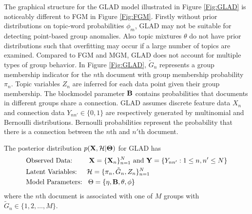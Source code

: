 The  graphical structure for the GLAD model illustrated in Figure \ref{Fig:GLAD} is noticeably different to FGM in Figure \ref{Fig:FGM}. Firstly without  prior distributions on topic-word probabilities $\phi_m$, GLAD may not be suitable for detecting point-based group anomalies. Also topic mixtures $\theta$ do not have prior distributions such that overfitting may occur if a large number of topics are examined. Compared to FGM and MGM, GLAD   does not account for multiple types of group behavior. %
In Figure \ref{Fig:GLAD}, 
  ${\tilde G}_{n}$ represents a group membership indicator for the $n$th document with group membership  probability $\pi_n$. Topic variables $Z_n$ are inferred for each data point given their group membership.    The blockmodel parameter $\bf B$ contains  probabilities that documents in different groups share a connection. %
GLAD assumes discrete feature data  $ X_{n}$ and connection data $Y_{n n'} \in \{0,1\}$  are respectively generated by  multinomial and Bernoulli distributions. Bernoulli probabilities represent the probability that there is a connection between the $n$th and $n'$th document.%

 The  posterior distribution %
$p({\bf X},\mathcal{H}| \boldsymbol\Theta) $ 
 for GLAD has %
 \begin{align*}
& \mbox{Observed Data:  \;\; \quad}  {\bf X}= \{{\bf X}_{n} \}_{n=1}^N \mbox{ and } {\bf Y} =\{Y_{nn'}: 1 \le n,n' \le N \} \\
 & \mbox{Latent Variables: \quad}    \mathcal{H}=\{\pi_{n},\tilde{G}_n, Z_{n} \}_{n=1}^N  \\
 & \mbox{Model Parameters: \;\,}  \Theta=\{\eta,{\bf B},\theta, \phi\}
 \end{align*} 
  where the $n$th document is associated with one of $M$ groups with $\tilde{  G}_{n}  \in \{1,2,\dots,M\}$. 
  

